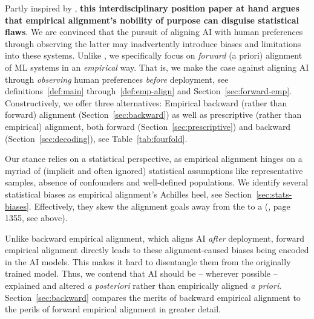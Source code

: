 \documentclass{article}
\theoremstyle{plain}
\theoremstyle{definition}
\theoremstyle{remark}
\begin{document}
Partly inspired by \citet{yangposition}, \textbf{this interdisciplinary position paper at hand argues that empirical alignment's nobility of purpose can disguise statistical flaws}. %
We are convinced that the pursuit of aligning AI with human preferences through observing the latter may inadvertently introduce biases and limitations into these systems. Unlike \citet{yangposition}, we specifically focus on \textit{forward} (a priori) alignment of ML systems in an \textit{empirical} way. That is, we make the case against aligning AI through \textit{observing} human preferences \textit{before} deployment, see definitions~\ref{def:main} through~\ref{def:emp-align} and Section~\ref{sec:forward-emp}. Constructively, we offer three alternatives: Empirical backward (rather than forward) alignment (Section~\ref{sec:backward}) as well as prescriptive (rather than empirical) alignment, both forward (Section~\ref{sec:prescriptive}) and backward (Section~\ref{sec:decoding}), see Table~\ref{tab:fourfold}.

Our stance relies on a statistical perspective, as empirical alignment hinges on a myriad of (implicit and often ignored) statistical assumptions like representative samples, absence of confounders and well-defined populations. We identify several statistical biases as empirical alignment's Achilles heel, see Section~\ref{sec:stats-biases}. Effectively, they skew the alignment goals away from the  to a  (\citet{wiener1960automation}, page 1355, see above).

Unlike backward empirical alignment, which aligns AI \textit{after} deployment, forward empirical alignment directly leads to these alignment-caused biases being encoded in the AI models. This makes it hard to disentangle them from the originally trained model. Thus, we contend that AI should be -- wherever possible -- explained and altered \textit{a posteriori} rather than empirically aligned \textit{a priori}.
Section~\ref{sec:backward} compares the merits of backward empirical alignment to the perils of forward empirical alignment in greater detail. 
%
\end{document}
